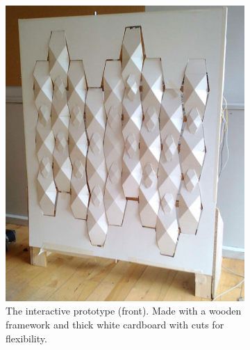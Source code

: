 \begin{figure}[h]
	\centering
	\begin{subfigure}{.44\textwidth}
		\centering
		\includegraphics[width=\linewidth]{figures/beomotion/prototype_front}
		\caption{The interactive prototype (front). Made with a wooden framework and thick white cardboard with cuts for flexibility.}
		\label{fig:beomotion:proto_front}
	\end{subfigure}%
	\hspace{.02\textwidth}
	\begin{subfigure}{.44\textwidth}
		\centering

\end{subfigure}
\end{figure}
